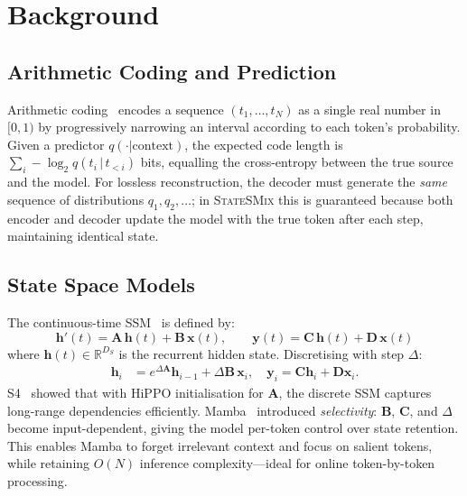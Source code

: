 \documentclass[10pt,twocolumn]{article}
\newcommand{\ssmcomp}{\textsc{StateSMix}}
\newcommand{\RR}{\mathbb{R}}
\begin{document}
\section{Background}
\label{sec:background}

\subsection{Arithmetic Coding and Prediction}

Arithmetic coding~\citep{witten1987} encodes a sequence
$(t_1,\ldots,t_N)$ as a single real number in $[0,1)$ by
progressively narrowing an interval according to each token's
probability.  Given a predictor $q(\cdot|\text{context})$, the
expected code length is $\sum_i -\log_2 q(t_i\,|\,t_{<i})$ bits,
equalling the cross-entropy between the true source and the model.
For lossless reconstruction, the decoder must generate the \emph{same}
sequence of distributions $q_1, q_2, \ldots$; in \ssmcomp{} this is
guaranteed because both encoder and decoder update the model with the
true token after each step, maintaining identical state.

\subsection{State Space Models}

The continuous-time SSM~\citep{kalman1960} is defined by:
\begin{equation}
  \mathbf{h}'(t) = \mathbf{A}\,\mathbf{h}(t) + \mathbf{B}\,\mathbf{x}(t),
  \qquad
  \mathbf{y}(t) = \mathbf{C}\,\mathbf{h}(t) + \mathbf{D}\,\mathbf{x}(t)
\end{equation}
where $\mathbf{h}(t)\in\RR^{D_S}$ is the recurrent hidden state.
Discretising with step $\Delta$:
\begin{align}
  \mathbf{h}_i &= e^{\Delta\mathbf{A}}\mathbf{h}_{i-1}
              + \Delta\mathbf{B}\,\mathbf{x}_i,
  \quad
  \mathbf{y}_i = \mathbf{C}\mathbf{h}_i + \mathbf{D}\mathbf{x}_i.
\end{align}
S4~\citep{gu2021s4} showed that with HiPPO initialisation for
$\mathbf{A}$, the discrete SSM captures long-range dependencies
efficiently.  Mamba~\citep{gu2023mamba} introduced \emph{selectivity}:
$\mathbf{B}$, $\mathbf{C}$, and $\Delta$ become input-dependent,
giving the model per-token control over state retention.  This enables
Mamba to forget irrelevant context and focus on salient tokens, while
retaining $O(N)$ inference complexity---ideal for online token-by-token
processing.
\end{document}
